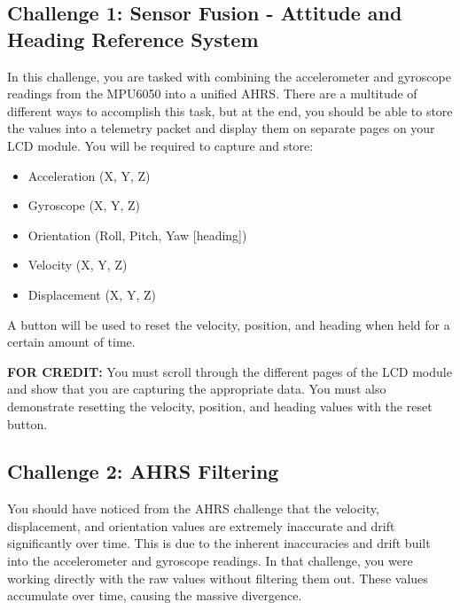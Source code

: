     \subsection*{Challenge 1: Sensor Fusion - Attitude and Heading Reference System}
    In this challenge, you are tasked with combining the accelerometer and gyroscope readings from the MPU6050 into a unified AHRS.
    There are a multitude of different ways to accomplish this task, but at the end, you should be able to store the values into a telemetry packet and display them on separate pages on your LCD module.
    You will be required to capture and store:

    \begin{itemize}
        \item Acceleration (X, Y, Z)
        \item Gyroscope (X, Y, Z)
        \item Orientation (Roll, Pitch, Yaw [heading])
        \item Velocity (X, Y, Z)
        \item Displacement (X, Y, Z)
    \end{itemize}

    A button will be used to reset the velocity, position, and heading when held for a certain amount of time.

    \textbf{FOR CREDIT:} You must scroll through the different pages of the LCD module and show that you are capturing the appropriate data.
    You must also demonstrate resetting the velocity, position, and heading values with the reset button.

    \subsection*{Challenge 2: AHRS Filtering}

    You should have noticed from the AHRS challenge that the velocity, displacement, and orientation values are extremely inaccurate and drift significantly over time.
    This is due to the inherent inaccuracies and drift built into the accelerometer and gyroscope readings.
    In that challenge, you were working directly with the raw values without filtering them out.
    These values accumulate over time, causing the massive divergence.

